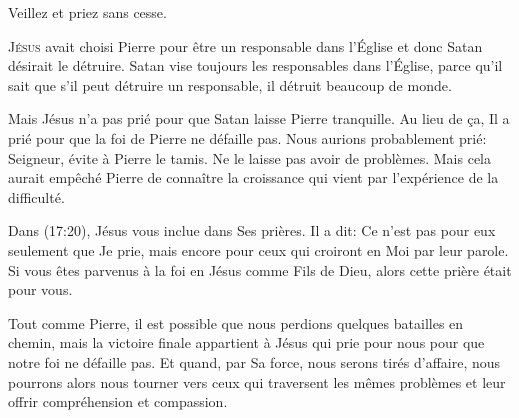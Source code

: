Veillez et priez \ocadr sans cesse.

\dvrule







\lettrine{J}{ésus} avait choisi Pierre pour être un responsable
 dans l'Église
 et donc Satan désirait le détruire.
 Satan vise toujours les responsables dans l'Église,
 parce qu'il sait que s'il peut détruire un responsable,
 il détruit beaucoup de monde.

Mais Jésus n'a pas prié pour que Satan laisse Pierre tranquille.
 Au lieu de \c{c}a, Il a prié pour que la foi de Pierre ne défaille pas.
 Nous aurions probablement prié: \Og Seigneur, évite à Pierre le tamis.
 Ne le laisse pas avoir de problèmes. \Fg{}
 Mais cela aurait empêché Pierre de connaître la croissance qui vient
 par l'expérience de la difficulté.


Dans (17:20), Jésus vous inclue dans Ses prières.
 Il a dit: 
 \Og Ce n'est pas pour eux seulement que Je prie, mais encore pour ceux
 qui croiront en Moi par leur parole. \Fg{}
 Si vous êtes parvenus à la foi en Jésus comme Fils de Dieu,
 alors cette prière était pour vous.

Tout comme Pierre, il est possible que nous perdions quelques batailles
 en chemin, mais la victoire  finale appartient à Jésus
 qui prie pour nous pour que notre foi ne défaille pas.
 Et quand, par Sa force, nous serons tirés d'affaire,
 nous pourrons alors nous tourner vers ceux qui traversent
 les mêmes problèmes et leur offrir compréhension et compassion.

\dvrule



